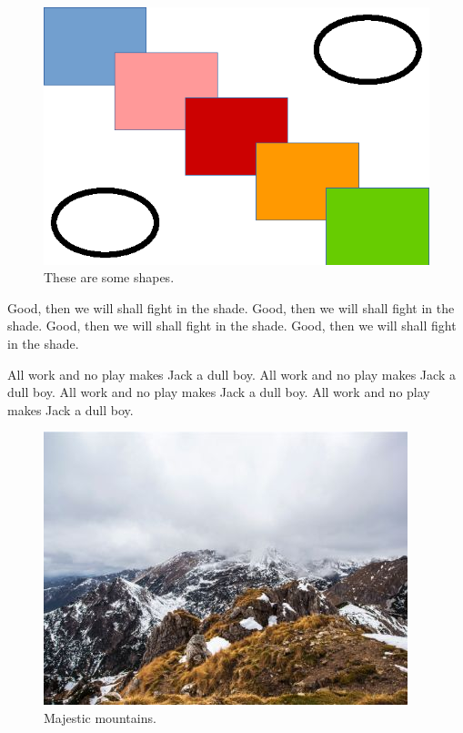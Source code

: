 \documentclass[twocolumn]{article}
\begin{document}
\begin{figure}[h]
\centering
\includegraphics{../figures/shapes.eps}
\caption{These are some shapes.}
\label{fig:shapes}
\end{figure}

Good, then we will shall fight in the shade.
Good, then we will shall fight in the shade.
Good, then we will shall fight in the shade.
Good, then we will shall fight in the shade.

All work and no play makes Jack a dull boy.
All work and no play makes Jack a dull boy.
All work and no play makes Jack a dull boy.
All work and no play makes Jack a dull boy.

\begin{figure}[h]
\centering
\includegraphics[width=\linewidth,natwidth=400,natheight=300]{../figures/mountains.jpg}
\caption{Majestic mountains.}
\label{fig:mountains}
\end{figure}
\end{document}
